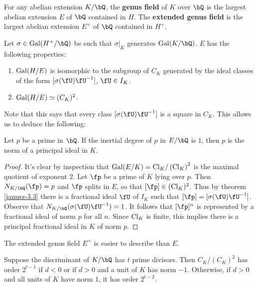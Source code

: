 \begin{defn}
    For any abelian extension $K / \bQ$, the \textbf{genus field} of $K$ over $\bQ$ is the largest abelian extension $E$ of $\bQ$ contained in $H$. The \textbf{extended genus field } is the largest abelian extension $E^{+}$ of $\bQ $ contained in $H^{+}$.
\end{defn}

Let $\sigma \in \Gal(H^{+} / \bQ)$ be such that $\sigma|_{K}$ generates $\Gal(K / \bQ)$. $E$ has the following properties:

\begin{thm}[Janusz 3.3]\label{janusz-3.3}
 
    \begin{enumerate}
        \item $\mathrm{Gal}(H / E)$ is isomorphic to the subgroup of $C_K$ generated by the ideal classes of the form $[\sigma(\fU)\fU^{-1}]$, $\fU \in I_K$. 
        \item $\mathrm{Gal}(H / E) \simeq (C_K)^2$. 
    \end{enumerate}
\end{thm}

Note that this says that every class $[\sigma(\fU) \fU^{-1}]$ is a square in $C_K$.
This allows us to deduce the following:

\begin{thm} 
Let $p$ be a prime in $\bQ$. If the inertial degree of $p$ in $E / \bQ$ is $1$, then $p$ is the norm of a principal ideal in $K$. 
\end{thm} 

\begin{proof}
It's clear by inspection that $\mathrm{Gal}(E / K) = \mathrm{Cl}_K / \left(\mathrm{Cl}_K\right)^2$ is the maximal quotient of exponent $2$. Let $\fp$ be a prime of $K$ lying over $p$. Then $N_{K / \bQ}(\fp) = p$ and $\fp$ splits in $E$, so that $[\fp] \in (\Cl_K)^2$. Thus by theorem \ref{janusz-3.3} there is a fractional ideal $\fU$ of $I_K$ such that 
$[\fp] = [\sigma(\fU)\fU^{-1}]$. Observe that $N_{K / \bQ}(\sigma(\fU)\fU^{-1}) = 1$. It follows that $[\fp]^n$ is represented by a fractional ideal of norm $p$ for all $n$. Since $\mathrm{Cl}_K$ is finite, this implies there is a principal fractional ideal in $K$ of norm $p$. 
\end{proof}

The extended genus field $E^{+}$ is easier to describe than $E$.

\begin{thm} 
Suppose the discriminant of $K / \bQ$ has $t$ prime divisors. Then $C_K / (C_K)^2$ has order $2^{t-1}$ if $d < 0$ or if $d > 0$ and a unit of $K$ has norm $-1$. Otherwise, if $d>0$ and all units of $K$ have norm $1$, it has order $2^{t - 2}$.
\end{thm} 

